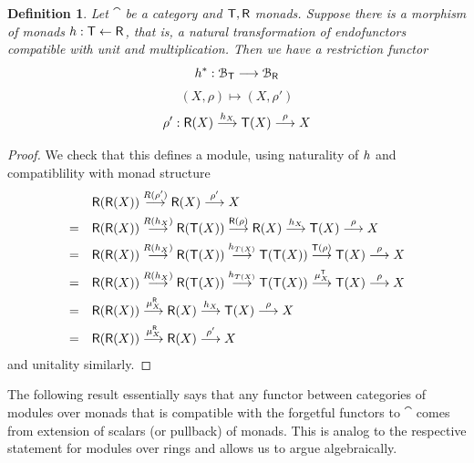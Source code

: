 \documentclass[a4paper, reqno]{amsart}
\newtheorem{definition}[theorem]{Definition}
\theoremstyle{introTheorems}
\renewcommand{\1}{\mathbbold{1}}
\begin{document}
\begin{definition}
Let $\cat$ be a category and ${\mathsf{T}},{\mathsf{R}}$ monads. Suppose there is a morphism of monads $h:{\mathsf{T}}\leftarrow {\mathsf{R}}$, that is, a natural transformation of endofunctors compatible with unit and multiplication. Then we have a restriction functor  
$$h^*: \mathcal{B}_{\mathsf{T}}\longrightarrow \mathcal{B}_{\mathsf{R}}$$
$$(X,\rho)\mapsto (X,\rho')$$
$$\rho':{\mathsf{R}}(X)
\stackrel{h_X}{\longrightarrow}{\mathsf{T}}(X)
\stackrel{\rho}{\longrightarrow} X$$ 
\end{definition}
\begin{proof}
We check that this defines a module, using naturality of $h$ and compatiblility with monad structure
\begin{align*}
&{\mathsf{R}}({\mathsf{R}}(X))
\stackrel{R(\rho')}{\longrightarrow}
{\mathsf{R}}(X)
\stackrel{\rho'}{\longrightarrow} 
X
\\
=\quad
&{\mathsf{R}}({\mathsf{R}}(X))
\stackrel{R(h_X)}{\longrightarrow}
{\mathsf{R}}({\mathsf{T}}(X))
\stackrel{{\mathsf{R}}(\rho)}{\longrightarrow} {\mathsf{R}}(X)
\stackrel{h_X}{\longrightarrow}
{\mathsf{T}}(X)
\stackrel{\rho}{\longrightarrow} 
X
\\
=\quad
&{\mathsf{R}}({\mathsf{R}}(X))
\stackrel{R(h_X)}{\longrightarrow}
{\mathsf{R}}({\mathsf{T}}(X))
\stackrel{h_{T(X)}}{\longrightarrow}
{\mathsf{T}}({\mathsf{T}}(X))
\stackrel{{\mathsf{T}}(\rho)}{\longrightarrow} {\mathsf{T}}(X)
\stackrel{\rho}{\longrightarrow} 
X
\\
=\quad
&{\mathsf{R}}({\mathsf{R}}(X))
\stackrel{R(h_X)}{\longrightarrow}
{\mathsf{R}}({\mathsf{T}}(X))
\stackrel{h_{T(X)}}{\longrightarrow}
{\mathsf{T}}({\mathsf{T}}(X))
\stackrel{\mu^{\mathsf{T}}_X}{\longrightarrow} {\mathsf{T}}(X)
\stackrel{\rho}{\longrightarrow} 
X
\\
=\quad
&{\mathsf{R}}({\mathsf{R}}(X))
\stackrel{\mu^{\mathsf{R}}_X}{\longrightarrow} {\mathsf{R}}(X)
\stackrel{h_X}{\longrightarrow}
{\mathsf{T}}(X)
\stackrel{\rho}{\longrightarrow} 
X
\\
=\quad
&{\mathsf{R}}({\mathsf{R}}(X))
\stackrel{\mu^{\mathsf{R}}_X}{\longrightarrow} {\mathsf{R}}(X)
\stackrel{\rho'}{\longrightarrow} 
X
\\
\end{align*}
and unitality similarly.
\end{proof}


The following result essentially says that any functor between categories of modules over monads that is compatible with the forgetful functors to $\cat$ comes from extension of scalars (or pullback) of monads. This is analog to the respective  statement for modules over rings and allows us to argue algebraically. 
\end{document}
